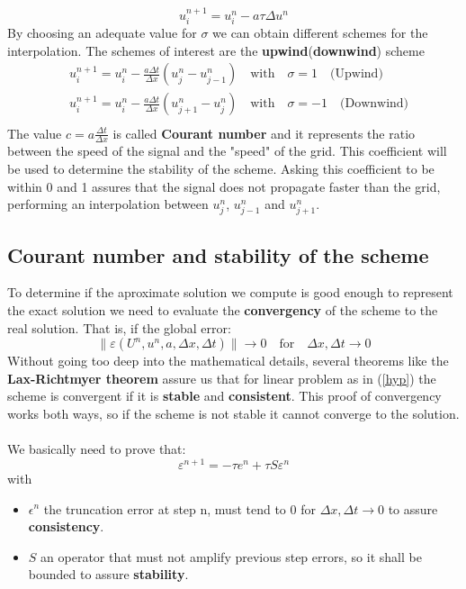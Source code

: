 \documentclass{report}
\begin{document}
\begin{equation*}
    u^{n+1}_i = u^n_i - a \tau \Delta u^n
\end{equation*}
By choosing an adequate value for $\sigma$ we can obtain different schemes for the interpolation. The schemes of interest are the \textbf{upwind}(\textbf{downwind}) scheme
\begin{align*}
     & u^{n+1}_i =  u^n_i - \frac{a \Delta t}{\Delta x}(u^n_j - u^n_{j-1}) \quad \textrm{with} \quad \sigma = 1 \quad \textrm{(Upwind)}    \\
     & u^{n+1}_i =  u^n_i - \frac{a \Delta t}{\Delta x}(u^n_{j+1} - u^n_j) \quad \textrm{with} \quad \sigma = -1 \quad \textrm{(Downwind)} \\
\end{align*}
The value $c = a\frac{\Delta t}{\Delta x}$ is called \textbf{Courant number} and it represents the ratio between the speed of the signal and the "speed" of the grid. This coefficient will be used to determine the stability of the scheme.
Asking this coefficient to be within 0 and 1 assures that the signal does not propagate faster than the grid, performing an interpolation between $u^n_j$, $u^n_{j-1}$ and $u^n_{j+1}$.
\subsection*{Courant number and stability of the scheme}
To determine if the aproximate solution we compute is good enough to represent the exact solution we need to evaluate the \textbf{convergency} of the scheme to the real solution.
That is, if the global error:
\begin{equation*}
    \| \varepsilon(U^n, u^n, a, \Delta x, \Delta t) \| \rightarrow 0 \quad \textrm{for} \quad \Delta x, \Delta t \rightarrow 0
\end{equation*}
Without going too deep into the mathematical details, several theorems like the \textbf{Lax-Richtmyer theorem} assure us that for linear problem as in (\ref*{hyp}) the scheme is convergent if it is \textbf{stable} and \textbf{consistent}.
This proof of convergency works both ways, so if the scheme is not stable it cannot converge to the solution.\\\\
We basically need to prove that:
\begin{equation*}
    \varepsilon^{n+1} = -\tau e^n +\tau S\varepsilon^n
\end{equation*}
with
\begin{itemize}
    \item $\epsilon^n$ the truncation error at step n, must tend to 0 for $\Delta x, \Delta t \rightarrow 0$ to assure \textbf{consistency}.
    \item $S$ an operator that must not amplify previous step errors, so it shall be bounded to assure \textbf{stability}.
\end{itemize}
\end{document}
